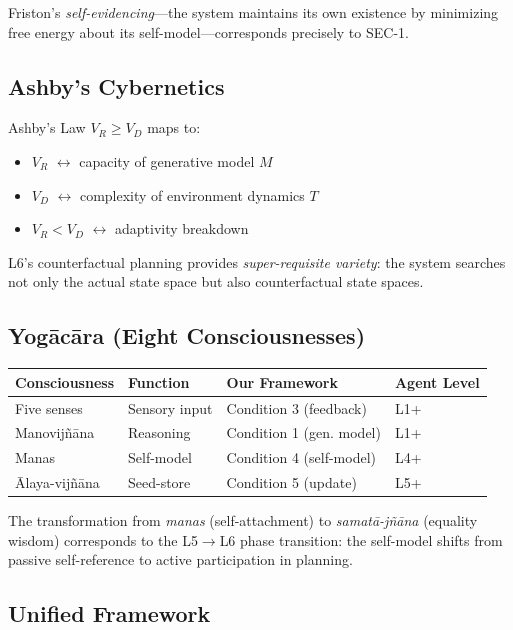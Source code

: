 \documentclass[11pt,a4paper]{article}
\begin{document}
Friston's \emph{self-evidencing}---the system maintains its own existence by minimizing free energy about its self-model---corresponds precisely to SEC-1.

\subsection{Ashby's Cybernetics}

Ashby's Law $V_R \geq V_D$ maps to:
\begin{itemize}
    \item $V_R$ $\leftrightarrow$ capacity of generative model $M$
    \item $V_D$ $\leftrightarrow$ complexity of environment dynamics $T$
    \item $V_R < V_D$ $\leftrightarrow$ adaptivity breakdown
\end{itemize}

L6's counterfactual planning provides \emph{super-requisite variety}: the system searches not only the actual state space but also counterfactual state spaces.

\subsection{Yog\={a}c\={a}ra (Eight Consciousnesses)}

\begin{table}[h]
\centering
\begin{tabular}{llll}
\toprule
Consciousness & Function & Our Framework & Agent Level \\
\midrule
Five senses & Sensory input & Condition 3 (feedback) & L1+ \\
Manovij\~{n}\={a}na & Reasoning & Condition 1 (gen. model) & L1+ \\
Manas & Self-model & Condition 4 (self-model) & L4+ \\
\={A}laya-vij\~{n}\={a}na & Seed-store & Condition 5 (update) & L5+ \\
\bottomrule
\end{tabular}
\end{table}

The transformation from \emph{manas} (self-attachment) to \emph{samat\={a}-j\~{n}\={a}na} (equality wisdom) corresponds to the L5$\to$L6 phase transition: the self-model shifts from passive self-reference to active participation in planning.

\subsection{Unified Framework}
\end{document}
